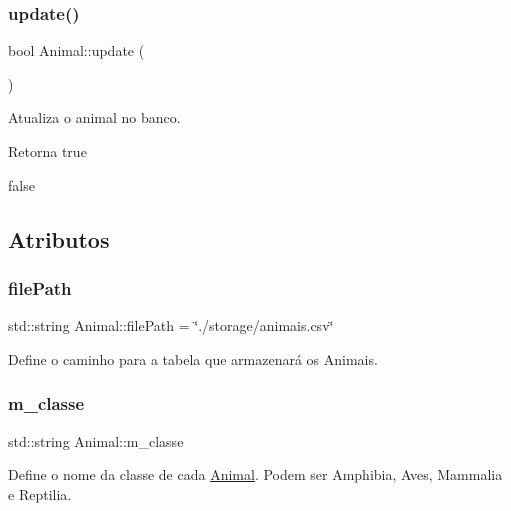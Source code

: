 \subsubsection{\texorpdfstring{update()}{update()}}
{\footnotesize\ttfamily bool Animal\+::update (\begin{DoxyParamCaption}{ }\end{DoxyParamCaption})}



Atualiza o animal no banco. 

\begin{DoxyReturn}{Retorna}
true 

false 
\end{DoxyReturn}


\subsection{Atributos}
\mbox{\label{classAnimal_a1e487e8b5e047f764f192a423e4d21ae}} 
\subsubsection{\texorpdfstring{file\+Path}{filePath}}
{\footnotesize\ttfamily std\+::string Animal\+::file\+Path = \char`\"{}./storage/animais.\+csv\char`\"{}\hspace{0.3cm}{\ttfamily [static]}}

Define o caminho para a tabela que armazenará os Animais. \mbox{\label{classAnimal_a8a4d049b481ab0fe88015cde7557d281}} 
\subsubsection{\texorpdfstring{m\+\_\+classe}{m\_classe}}
{\footnotesize\ttfamily std\+::string Animal\+::m\+\_\+classe\hspace{0.3cm}{\ttfamily [protected]}}

Define o nome da classe de cada \hyperlink{classAnimal}{Animal}. Podem ser Amphibia, Aves, Mammalia e Reptilia. \mbox{\label{classAnimal_af7ea074464d9a468f7412a2165afd553}} 
